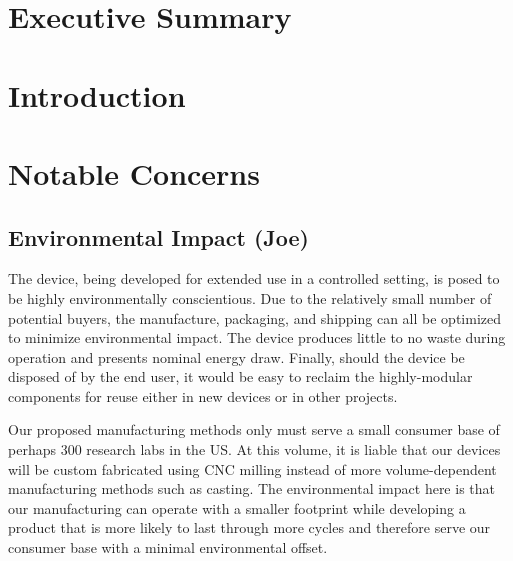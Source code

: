 \documentclass{article}
\begin{document}

\setcounter{tocdepth}{2}
\tableofcontents
\newpage
\listoftables
\listoffigures
\newpage


\section*{Executive Summary}
\label{sec:exec-summary}



\newpage


\section{Introduction}
\label{sec:introduction}



\section{Notable Concerns}
\label{sec:concerns}



\subsection{Environmental Impact (Joe)}
\label{sec:environment}

The device, being developed for extended use in a controlled setting,
is posed to be highly environmentally conscientious. Due to the
relatively small number of potential buyers, the manufacture,
packaging, and shipping can all be optimized to minimize environmental
impact. The device produces little to no waste during operation and
presents nominal energy draw. Finally, should the device be disposed
of by the end user, it would be easy to reclaim the highly-modular
components for reuse either in new devices or in other projects.

Our proposed manufacturing methods only must serve a small consumer
base of perhaps 300 research labs in the US. At this volume, it is
liable that our devices will be custom fabricated using CNC milling
instead of more volume-dependent manufacturing methods such as
casting. The environmental impact here is that our manufacturing can
operate with a smaller footprint while developing a product that is
more likely to last through more cycles and therefore serve our
consumer base with a minimal environmental offset.
\end{document}
